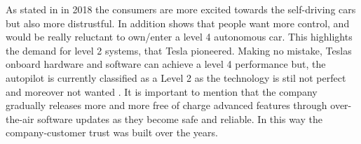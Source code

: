 \documentclass{article} %
\begin{document}
As stated in \cite{Pilot:Awareness} in 2018 the consumers are more excited towards the self-driving cars \cite{Feedback Users Autopilot} but also more distrustful. 
In addition \cite{Pilot:Awareness} shows that people want more control, and would be really reluctant to own/enter a level 4 autonomous car. This highlights the demand for level 2 systems, that Tesla pioneered. %
Making no mistake, Teslas onboard hardware and software can achieve a level 4 performance \cite{Full Self-Driving} but, the autopilot is currently classified as a Level 2 as the technology is stil not perfect and moreover not wanted \cite{Pilot:Awareness} \cite{Pilot:CheatSheet}.
It is important to mention that the company gradually releases more and more free of charge advanced features through over-the-air software updates as they become safe and reliable.
In this way  the company-customer trust was built over the years.


\end{document}
